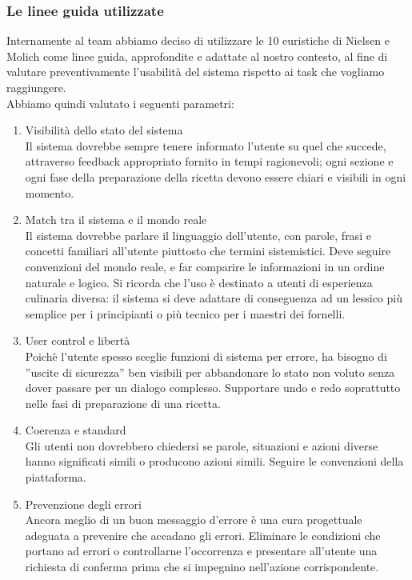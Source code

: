\subsubsection{Le linee guida utilizzate}
Internamente al team abbiamo deciso di utilizzare le 10 euristiche di Nielsen e Molich come linee guida, approfondite e adattate al nostro contesto, al fine di valutare preventivamente l’usabilità del sistema rispetto ai task che vogliamo raggiungere.\\
Abbiamo quindi valutato i seguenti parametri:
\begin{enumerate}

\item Visibilità dello stato del sistema\\
Il sistema dovrebbe sempre tenere informato l’utente su quel che succede,
attraverso feedback appropriato fornito in tempi ragionevoli; ogni sezione e ogni fase della preparazione della ricetta devono essere chiari e visibili in ogni momento.

\item Match tra il sistema e il mondo reale\\
Il sistema dovrebbe parlare il linguaggio dell’utente, con parole, frasi e
concetti familiari all’utente piuttosto che termini sistemistici. Deve seguire
convenzioni del mondo reale, e far comparire le informazioni in un ordine
naturale e logico. Si ricorda che l'uso è destinato a utenti di esperienza culinaria diversa: il sistema si deve adattare di conseguenza ad un lessico più semplice per i principianti o più tecnico per i maestri dei fornelli. \\

\item User control e libertà\\
Poichè l’utente spesso sceglie funzioni di sistema per errore, ha bisogno
di ”uscite di sicurezza” ben visibili per abbandonare lo stato non voluto
senza dover passare per un dialogo complesso. Supportare undo e redo soprattutto nelle fasi di preparazione di una ricetta.\\

\item Coerenza e standard\\
Gli utenti non dovrebbero chiedersi se parole, situazioni e azioni diverse
hanno significati simili o producono azioni simili. Seguire le convenzioni
della piattaforma.\\

\item Prevenzione degli errori\\
Ancora meglio di un buon messaggio d’errore è una cura progettuale adeguata a prevenire che accadano gli errori. Eliminare le condizioni che portano ad errori o controllarne l’occorrenza e presentare all’utente una richiesta di conferma prima che si impegnino nell’azione corrispondente.\\


\end{enumerate}
